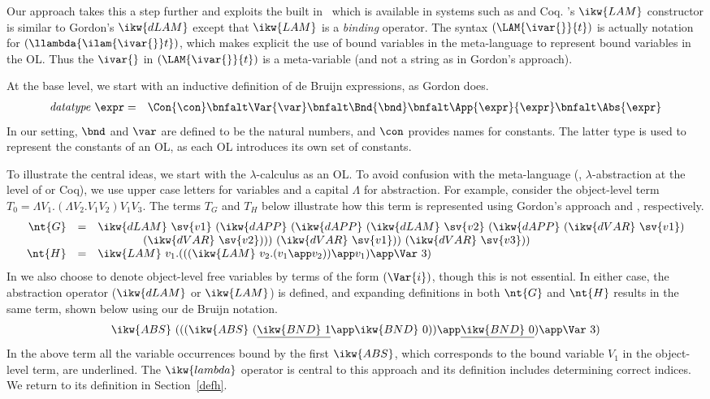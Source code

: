 \documentclass[final]{svjour3}
\begin{document}
Our approach
takes this a step further and exploits the built in \hoas\ which is
available in systems such as \HOL and Coq.
\hybrid's $\ikw{LAM}$ constructor is similar to Gordon's $\ikw{dLAM}$
except that $\ikw{LAM}$ is a \emph{binding} operator.  The syntax
$(\LAM{\ivar{\null}}{t})$ is actually notation for
$(\llambda{\ilam{\ivar{}}t})$, which makes explicit the use of {bound
variables in the meta-language} to represent {bound variables in the
OL}.  Thus the $\ivar{\null}$ in $(\LAM{\ivar{\null}}{t})$ is
a meta-variable (and not a string as in Gordon's approach).  

At the base level, we start with an inductive definition of de Bruijn
expressions, as Gordon does.
\begin{eqnarray*}
 \mathit{datatype} \ \expr  & = &       \Con{\con}
       \bnfalt      \Var{\var} 
       \bnfalt      \Bnd{\bnd} 
       \bnfalt      \App{\expr}{\expr} 
       \bnfalt      \Abs{\expr}
\end{eqnarray*}
In our setting, $\bnd$ and $\var$ are defined to be the natural
numbers, and $\con$ provides names for constants.  The latter type is
used to represent the constants of an OL, as each
OL introduces its own set of constants.

To illustrate the central ideas, we start with the $\lambda$-calculus
as an OL\@.  To avoid confusion with the meta-language
(\ie, $\lambda$-abstraction at the level of \HOL or Coq), we use
upper case letters for variables and a capital $\Lambda$ for
abstraction.  For example, consider the object-level term 
$T_0 = \Lambda V_1.(\Lambda V_2.V_1 V_2) V_1 V_3$.
The terms $T_G$ and $T_H$ below illustrate how this term is
represented using Gordon's approach and \hybrid, respectively.
$$\begin{array}{rcl}
\nt{G} & = & \ikw{dLAM}~\sv{v1}~
          (\ikw{dAPP}~
            (\ikw{dAPP}~
               (\ikw{dLAM}~\sv{v2}~
                  (\ikw{dAPP}~(\ikw{dVAR}~\sv{v1})\\
& &\qquad\qquad
                              (\ikw{dVAR}~\sv{v2})))~
               (\ikw{dVAR}~\sv{v1}))~
            (\ikw{dVAR}~\sv{v3})
          ) \\
\nt{H} & = & \ikw{LAM}~v_1.
          (
            ((\ikw{LAM}~v_2. (v_1\app v_2))\app v_1)\app
            \Var~3
          ) \\
\end{array}$$
In \hybrid we also choose to denote object-level free variables by terms
of the form $(\Var{i})$, though this is not essential.
In either case, the abstraction operator ($\ikw{dLAM}$ or $\ikw{LAM}$) is
defined, and expanding definitions in both $\nt{G}$ and $\nt{H}$
results in the same term, shown below using our de Bruijn notation.
$$\ikw{ABS}~(((\ikw{ABS}~(\underline{\ikw{BND}~1}\app\ikw{BND}~0))\app
\underline{\ikw{BND}~{0}})\app\Var~3)$$
In the above term all the variable occurrences bound by the first
$\ikw{ABS}$, which corresponds to the bound variable $V_1$ in the
object-level term, are underlined.  The $\ikw{lambda}$ operator is
central to this approach and its definition includes determining
correct indices.  We return to its definition in
Section~\ref{defh}.
\end{document}

